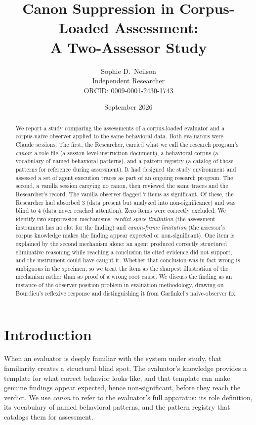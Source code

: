 \documentclass[11pt,a4paper]{article}
\title{%
  Canon Suppression in Corpus-Loaded Assessment: \\
  A Two-Assessor Study%
}
\author{Sophie D.\ Neilson \\
  \small Independent Researcher \\
  \small ORCID: \href{https://orcid.org/0009-0001-2430-1743}{0009-0001-2430-1743}
}
\date{September 2026}
\begin{document}
\maketitle

\begin{abstract}
We report a study comparing the assessments of a corpus-loaded evaluator and a
corpus-naive observer applied to the same behavioral data. Both evaluators were
Claude sessions. The first, the Researcher, carried what we call the research
program's \emph{canon}: a role file (a session-level instruction document), a
behavioral corpus (a vocabulary of named behavioral patterns), and a
pattern registry (a catalog of those patterns for reference during assessment). It had designed the study environment
and assessed a set of agent execution traces as part of an ongoing research
program. The second, a vanilla session carrying no canon, then reviewed the
same traces and the Researcher's record. The vanilla observer flagged 7 items as significant. Of these, the
Researcher had absorbed 3 (data present but analyzed into non-significance)
and was blind to 4 (data never reached attention). Zero items were correctly
excluded. We identify two suppression mechanisms: \emph{verdict-space
limitation} (the assessment instrument has no slot for the finding) and
\emph{canon-frame limitation} (the assessor's corpus knowledge makes the
finding appear expected or non-significant). One item is explained by the
second mechanism alone: an agent produced correctly structured eliminative
reasoning while reaching a conclusion its cited evidence did not support, and
the instrument could have caught it. Whether that conclusion was in fact wrong
is ambiguous in the specimen, so we treat the item as the sharpest
illustration of the mechanism rather than as proof of a wrong root cause. We
discuss the finding as an instance of the observer-position problem in
evaluation methodology, drawing on Bourdieu's reflexive response and
distinguishing it from Garfinkel's naive-observer fix.
\end{abstract}

\section{Introduction}

When an evaluator is deeply familiar with the system under study, that
familiarity creates a structural blind spot. The evaluator's knowledge provides
a template for what correct behavior looks like, and that template can make
genuine findings appear expected, hence non-significant, before they reach the
verdict. We use \emph{canon} to refer to the evaluator's full apparatus: its
role definition, its vocabulary of named behavioral patterns, and the pattern
registry that catalogs them for assessment.
\end{document}
